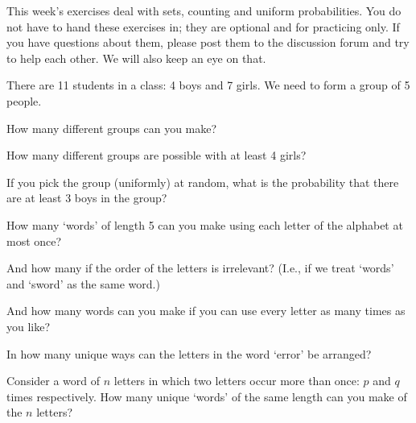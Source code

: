\documentclass[a4paper,10pt,landscape,twocolumn]{scrartcl}
\begin{document}
\practiceproblems

{\sffamily\noindent
This week's exercises deal with sets, counting and uniform probabilities. You do not have to hand these exercises in; they are optional and for practicing only. If you have questions about them, please post them to the discussion forum and try to help each other. We will also keep an eye on that.
}

\begin{exercise}[]
	There are 11 students in a class: 4 boys and 7 girls. We need to form a group of 5 people.
	
	\begin{subex}
		How many different groups can you make?	
	\end{subex}

	 \begin{subex}
	 		How many different groups are possible with at least 4 girls?
	 \end{subex}
	 
	 \begin{subex}
		If you pick the group (uniformly) at random, what is the probability that there are at least 3 boys in the group?
	 \end{subex}
\end{exercise}

\begin{exercise}[Words]
	\begin{subex}
	How many `words' of length 5 can you make using each letter of the alphabet at most once?
	\end{subex}
	
	\begin{subex}
	And how many if the order of the letters is irrelevant? (I.e., if we treat `words'  and `sword' as the same word.)
	\end{subex}
	
	\begin{subex}
	And how many words can you make if you can use every letter as many times as you like?	
	\end{subex}

	\begin{subex}
	In how many unique ways can the letters in the word `error' be arranged?
	\end{subex}

	\begin{subex}
	 Consider a word of $n$ letters in which two letters occur more than once: $p$ and $q$ times respectively. How many unique `words' of the same length can you make of the $n$ letters?
	\end{subex}
\end{exercise}
\end{document}
